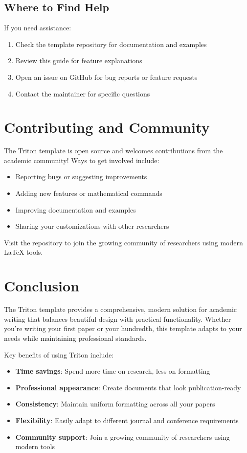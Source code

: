 \documentclass{triton}
\begin{document}
\subsection{Where to Find Help}

If you need assistance:

\begin{enumerate}
    \item Check the template repository for documentation and examples
    \item Review this guide for feature explanations
    \item Open an issue on GitHub for bug reports or feature requests
    \item Contact the maintainer for specific questions
\end{enumerate}

\section{Contributing and Community}

The Triton template is open source and welcomes contributions from the academic community! Ways to get involved include:

\begin{itemize}
    \item Reporting bugs or suggesting improvements
    \item Adding new features or mathematical commands
    \item Improving documentation and examples
    \item Sharing your customizations with other researchers
\end{itemize}

Visit the repository to join the growing community of researchers using modern \LaTeX{} tools.

\section{Conclusion}

The Triton template provides a comprehensive, modern solution for academic writing that balances beautiful design with practical functionality. Whether you're writing your first paper or your hundredth, this template adapts to your needs while maintaining professional standards.

Key benefits of using Triton include:

\begin{itemize}
    \item \textbf{Time savings}: Spend more time on research, less on formatting
    \item \textbf{Professional appearance}: Create documents that look publication-ready
    \item \textbf{Consistency}: Maintain uniform formatting across all your papers
    \item \textbf{Flexibility}: Easily adapt to different journal and conference requirements
    \item \textbf{Community support}: Join a growing community of researchers using modern tools
\end{itemize}
\end{document}
